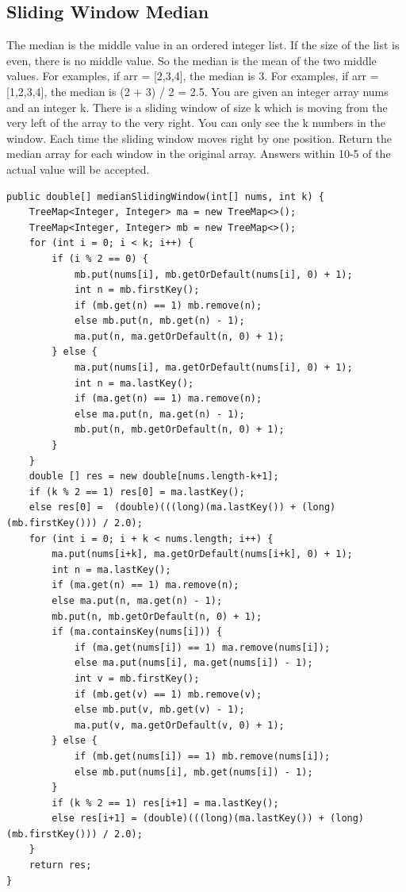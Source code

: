 \documentclass[9pt, b5paper]{article}
\begin{document}
\subsection{Sliding Window Median}
\label{sec-5-6}
The median is the middle value in an ordered integer list. If the size of the list is even, there is no middle value. So the median is the mean of the two middle values.
For examples, if arr = [2,3,4], the median is 3.
For examples, if arr = [1,2,3,4], the median is (2 + 3) / 2 = 2.5.
You are given an integer array nums and an integer k. There is a sliding window of size k which is moving from the very left of the array to the very right. You can only see the k numbers in the window. Each time the sliding window moves right by one position.
Return the median array for each window in the original array. Answers within 10-5 of the actual value will be accepted.
\begin{verbatim}
public double[] medianSlidingWindow(int[] nums, int k) {
    TreeMap<Integer, Integer> ma = new TreeMap<>();
    TreeMap<Integer, Integer> mb = new TreeMap<>();
    for (int i = 0; i < k; i++) {
        if (i % 2 == 0) {
            mb.put(nums[i], mb.getOrDefault(nums[i], 0) + 1);
            int n = mb.firstKey();
            if (mb.get(n) == 1) mb.remove(n);
            else mb.put(n, mb.get(n) - 1);
            ma.put(n, ma.getOrDefault(n, 0) + 1);
        } else {
            ma.put(nums[i], ma.getOrDefault(nums[i], 0) + 1);
            int n = ma.lastKey();
            if (ma.get(n) == 1) ma.remove(n);
            else ma.put(n, ma.get(n) - 1);
            mb.put(n, mb.getOrDefault(n, 0) + 1);
        }
    }
    double [] res = new double[nums.length-k+1];
    if (k % 2 == 1) res[0] = ma.lastKey();
    else res[0] =  (double)(((long)(ma.lastKey()) + (long)(mb.firstKey())) / 2.0);
    for (int i = 0; i + k < nums.length; i++) {
        ma.put(nums[i+k], ma.getOrDefault(nums[i+k], 0) + 1);
        int n = ma.lastKey();
        if (ma.get(n) == 1) ma.remove(n);
        else ma.put(n, ma.get(n) - 1);
        mb.put(n, mb.getOrDefault(n, 0) + 1);
        if (ma.containsKey(nums[i])) {
            if (ma.get(nums[i]) == 1) ma.remove(nums[i]);
            else ma.put(nums[i], ma.get(nums[i]) - 1);
            int v = mb.firstKey();
            if (mb.get(v) == 1) mb.remove(v);
            else mb.put(v, mb.get(v) - 1);
            ma.put(v, ma.getOrDefault(v, 0) + 1);
        } else {
            if (mb.get(nums[i]) == 1) mb.remove(nums[i]);
            else mb.put(nums[i], mb.get(nums[i]) - 1);
        }
        if (k % 2 == 1) res[i+1] = ma.lastKey();
        else res[i+1] = (double)(((long)(ma.lastKey()) + (long)(mb.firstKey())) / 2.0);
    }
    return res;
}
\end{verbatim}
\end{document}
